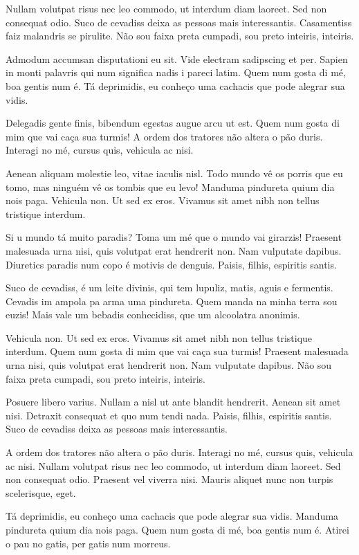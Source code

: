 \documentclass{article}
\begin{document}
	Nullam volutpat risus nec leo commodo, ut interdum diam laoreet. Sed non consequat odio. Suco de cevadiss deixa as pessoas mais interessantis. Casamentiss faiz malandris se pirulite. Não sou faixa preta cumpadi, sou preto inteiris, inteiris.
	
	Admodum accumsan disputationi eu sit. Vide electram sadipscing et per. Sapien in monti palavris qui num significa nadis i pareci latim. Quem num gosta di mé, boa gentis num é. Tá deprimidis, eu conheço uma cachacis que pode alegrar sua vidis.
	
	Delegadis gente finis, bibendum egestas augue arcu ut est. Quem num gosta di mim que vai caça sua turmis! A ordem dos tratores não altera o pão duris. Interagi no mé, cursus quis, vehicula ac nisi.
	
	Aenean aliquam molestie leo, vitae iaculis nisl. Todo mundo vê os porris que eu tomo, mas ninguém vê os tombis que eu levo! Manduma pindureta quium dia nois paga. Vehicula non. Ut sed ex eros. Vivamus sit amet nibh non tellus tristique interdum.
	
	Si u mundo tá muito paradis? Toma um mé que o mundo vai girarzis! Praesent malesuada urna nisi, quis volutpat erat hendrerit non. Nam vulputate dapibus. Diuretics paradis num copo é motivis de denguis. Paisis, filhis, espiritis santis.
	
	Suco de cevadiss, é um leite divinis, qui tem lupuliz, matis, aguis e fermentis. Cevadis im ampola pa arma uma pindureta. Quem manda na minha terra sou euzis! Mais vale um bebadis conhecidiss, que um alcoolatra anonimis.
	
	Vehicula non. Ut sed ex eros. Vivamus sit amet nibh non tellus tristique interdum. Quem num gosta di mim que vai caça sua turmis! Praesent malesuada urna nisi, quis volutpat erat hendrerit non. Nam vulputate dapibus. Não sou faixa preta cumpadi, sou preto inteiris, inteiris.
	
	Posuere libero varius. Nullam a nisl ut ante blandit hendrerit. Aenean sit amet nisi. Detraxit consequat et quo num tendi nada. Paisis, filhis, espiritis santis. Suco de cevadiss deixa as pessoas mais interessantis.
	
	A ordem dos tratores não altera o pão duris. Interagi no mé, cursus quis, vehicula ac nisi. Nullam volutpat risus nec leo commodo, ut interdum diam laoreet. Sed non consequat odio. Praesent vel viverra nisi. Mauris aliquet nunc non turpis scelerisque, eget.
	
	Tá deprimidis, eu conheço uma cachacis que pode alegrar sua vidis. Manduma pindureta quium dia nois paga. Quem num gosta di mé, boa gentis num é. Atirei o pau no gatis, per gatis num morreus.
	
\end{document}
